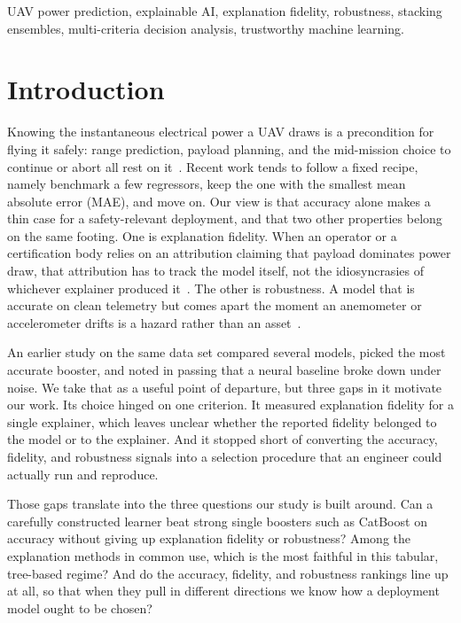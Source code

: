 \documentclass[conference]{IEEEtran}
\begin{document}
\begin{IEEEkeywords}
UAV power prediction, explainable AI, explanation fidelity, robustness, stacking ensembles, multi-criteria decision analysis, trustworthy machine learning.
\end{IEEEkeywords}

\section{Introduction}
Knowing the instantaneous electrical power a UAV draws is a precondition for flying it safely: range prediction, payload planning, and the mid-mission choice to continue or abort all rest on it~\cite{stolaroff2018energy,thibbotuwawa2020energy}. Recent work tends to follow a fixed recipe, namely benchmark a few regressors, keep the one with the smallest mean absolute error (MAE), and move on. Our view is that accuracy alone makes a thin case for a safety-relevant deployment, and that two other properties belong on the same footing. One is explanation fidelity. When an operator or a certification body relies on an attribution claiming that payload dominates power draw, that attribution has to track the model itself, not the idiosyncrasies of whichever explainer produced it~\cite{jacovi2020towards,rudin2019stop}. The other is robustness. A model that is accurate on clean telemetry but comes apart the moment an anemometer or accelerometer drifts is a hazard rather than an asset~\cite{hendrycks2019benchmarking}.

An earlier study on the same data set compared several models, picked the most accurate booster, and noted in passing that a neural baseline broke down under noise. We take that as a useful point of departure, but three gaps in it motivate our work. Its choice hinged on one criterion. It measured explanation fidelity for a single explainer, which leaves unclear whether the reported fidelity belonged to the model or to the explainer. And it stopped short of converting the accuracy, fidelity, and robustness signals into a selection procedure that an engineer could actually run and reproduce.

Those gaps translate into the three questions our study is built around. Can a carefully constructed learner beat strong single boosters such as CatBoost on accuracy without giving up explanation fidelity or robustness? Among the explanation methods in common use, which is the most faithful in this tabular, tree-based regime? And do the accuracy, fidelity, and robustness rankings line up at all, so that when they pull in different directions we know how a deployment model ought to be chosen?
\end{document}
